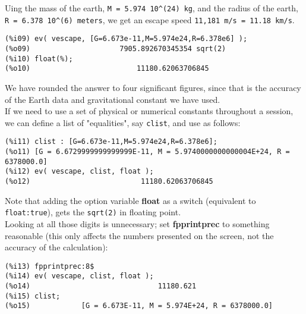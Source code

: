 \documentclass[12pt]{article}
\begin{document}
Uing the mass of the earth, \verb|M = 5.974 10^(24) kg|, and the radius of the earth,\\
  \verb|R = 6.378 10^(6) meters|, we get an escape speed \verb|11,181 m/s = 11.18 km/s|.
\small
\begin{verbatim}
(%i09) ev( vescape, [G=6.673e-11,M=5.974e24,R=6.378e6] );
(%o09)                     7905.892670345354 sqrt(2)
(%i10) float(%);
(%o10)                         11180.62063706845
\end{verbatim}
\normalsize
We have rounded the answer to four significant figures, since that is the accuracy of
  the Earth data and gravitational constant we have used.  \\
If we need to use a set of physical or numerical constants throughout a session,
  we can define a list of "equalities", say \verb|clist|, and use as follows:
  \small
  \begin{verbatim}
(%i11) clist : [G=6.673e-11,M=5.974e24,R=6.378e6];
(%o11) [G = 6.6729999999999999E-11, M = 5.9740000000000004E+24, R = 6378000.0]
(%i12) ev( vescape, clist, float );
(%o12)                          11180.62063706845 
\end{verbatim}
\normalsize
Note that adding the option variable \textbf{float} as a switch (equivalent to
  \verb|float:true|), gets the \verb|sqrt(2)| in floating point.\\
  
Looking at all those digits is unnecessary; set \textbf{fpprintprec} to something
  reasonable (this only affects the numbers presented on the screen, not the
  accuracy of the calculation):
\small
\begin{verbatim}
(%i13) fpprintprec:8$
(%i14) ev( vescape, clist, float );
(%o14)                              11180.621
(%i15) clist;
(%o15)            [G = 6.673E-11, M = 5.974E+24, R = 6378000.0] 
  \end{verbatim}
  \normalsize
  
 
 
 
 
 
\end{document}
